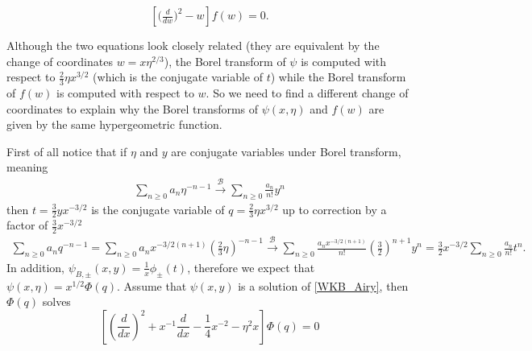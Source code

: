 \documentclass{article}
\newcommand{\borel}{\mathcal{B}}
\theoremstyle{definition}
\theoremstyle{plain}
\begin{document}
\begin{equation}
\label{Airy}
\left[\big(\tfrac{d}{dw}\big)^2 -  w \right] f(w) = 0.
\end{equation}

Although the two equations look closely related (they are equivalent by the change of coordinates $w=x\eta^{2/3}$), the Borel transform of $\psi$ is computed with respect to $\frac{2}{3}\eta x^{3/2}$ (which is the conjugate variable of $t$) while the Borel transform of $f(w)$ is computed with respect to $w$. So we need to find a different change of coordinates to explain why the Borel transforms of $\psi(x,\eta)$ and $f(w)$ are given by the same hypergeometric function. 

First of all notice that if $\eta$ and $y$ are conjugate variables under Borel transform, meaning 
\begin{align*}
\sum_{n\geq 0}a_n\eta^{-n-1}  \overset{\borel}{\longrightarrow} \sum_{n\geq 0}\frac{a_n}{n!} y^{n} 
\end{align*} 
then $t=\frac{3}{2}yx^{-3/2}$ is the conjugate variable of $q=\frac{2}{3}\eta x^{3/2}$ up to correction by a factor of $\frac{3}{2}x^{-3/2}$
\begin{align*}
\sum_{n\geq 0}a_nq^{-n-1}=\sum_{n\geq 0}a_nx^{-3/2(n+1)}\left(\frac{2}{3}\eta\right)^{-n-1}  \overset{\borel}{\longrightarrow} \sum_{n\geq 0}\frac{a_nx^{-3/2(n+1)}}{n!}\left(\frac{3}{2}\right)^{n+1}  y^{n}=\frac{3}{2}x^{-3/2}\sum_{n\geq 0}\frac{a_n}{n!} t^{n}. 
\end{align*}
In addition, $\psi_{B,\pm}(x,y)=\frac{1}{x}\phi_{\pm}(t)$, therefore we expect that $\psi(x,\eta)=x^{1/2}\Phi(q)$. Assume that $\psi(x,y)$ is a solution of \eqref{WKB_Airy}, then $\Phi(q)$ solves 
\begin{equation}
\label{eq_Phi}
\left[\left(\frac{d}{dx}\right)^2+x^{-1}\frac{d}{dx}-\frac{1}{4}x^{-2} - \eta^2 x \right] \Phi(q) = 0
\end{equation}
\end{document}
